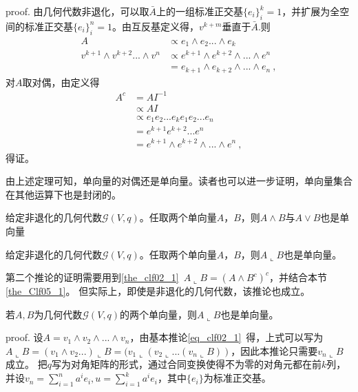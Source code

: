 proof.
由几何代数非退化，可以取$\bar A$上的一组标准正交基$\{e_i\}^k_i=1$，并扩展为全空间的标准正交基$\{e_i\}^n_i=1$。由互反基定义得，$v^{k+m}$垂直于$\bar A$.则
\begin{equation}
\begin{aligned}
A&\propto e_1\wedge e_2...\wedge e_k\\
v^{k+1}\wedge v^{k+2}...\wedge v^n&\propto e^{k+1}\wedge e^{k+2}\wedge...\wedge e^n\\
&=e_{k+1}\wedge e_{k+2}\wedge...\wedge e_n~,
\end{aligned}
\end{equation}
对$A$取对偶，由定义得
\begin{equation}
\begin{aligned}
A^c&=AI^{-1}\\
&\propto AI\\
&\propto e_1 e_2... e_k e_1 e_2... e_n\\
&=e^{k+1} e^{k+2}... e^n\\
&=e^{k+1}\wedge e^{k+2}\wedge...\wedge e^n~,
\end{aligned}
\end{equation}
得证。

由上述定理可知，单向量的对偶还是单向量。读者也可以进一步证明，单向量集合在其他运算下也是封闭的。
\begin{corollary}{}
给定非退化的几何代数$\mathcal G(V,q)$。任取两个单向量$A$，$B$，则$A\wedge B$与$A\vee B$也是单向量
\end{corollary}
\begin{corollary}{}\label{cor_Clf05_1}
给定非退化的几何代数$\mathcal G(V,q)$。任取两个单向量$A$，$B$，则$A\llcorner B$也是单向量。
\end{corollary}
第二个推论的证明需要用到\autoref{the_clf02_1}~$A\llcorner B=(A\wedge B^c)^c$，并结合本节\autoref{the_Clf05_1}。
但实际上，即使是非退化的几何代数，该推论也成立。
\begin{corollary}{}\label{cor_Clf05_2}
若$A,B$为几何代数$\mathcal G(V,q)$的两个单向量，则$A\llcorner B$也是单向量。
\end{corollary}
proof.
设$A=v_1\wedge v_2\wedge...\wedge v_n$，由基本推论\autoref{eq_clf02_1}~得，上式可以写为$A\llcorner B=(v_1\wedge v_2...)\llcorner B=(v_1\llcorner (v_2\llcorner...(v_n\llcorner B))$，因此本推论只需要$v_n\llcorner B$成立。
把$q$写为对角矩阵的形式，通过合同变换使得不为零的对角元都在前$k$列，并设$v_n=\sum \limits^{n}_{i=1}a^i e_i,u=\sum \limits^{k}_{i=1}a^i e_i$，其中$\{e_i\}$为标准正交基。

